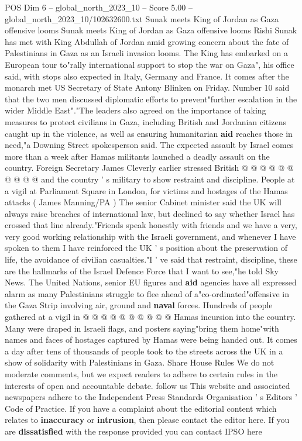 \begin{textsample}{POS Dim 6 – global\_north\_2023\_10 – Score 5.00 – global\_north\_2023\_10/102632600.txt}  \label{ex:f6_pos_244}
Sunak meets King of Jordan as Gaza offensive looms Sunak meets King of Jordan as Gaza offensive looms Rishi Sunak has met with King Abdullah of Jordan amid growing concern about the fate of Palestinians in Gaza as an Israeli invasion looms.
The King has embarked on a European tour to"rally international support to stop the war on Gaza", his office said, with stops also expected in Italy, Germany and France.
It comes after the monarch met US Secretary of State Antony Blinken on Friday.
Number 10 said that the two men discussed diplomatic efforts to prevent"further escalation in the wider Middle East"."The leaders also agreed on the importance of taking measures to protect civilians in Gaza, including British and Jordanian citizens caught up in the violence, as well as ensuring humanitarian \textbf{aid} reaches those in need,"a Downing Street spokesperson said.
The expected assault by Israel comes more than a week after Hamas militants launched a deadly assault on the country.
Foreign Secretary James Cleverly earlier stressed British @ @ @ @ @ @ @ @ @ @ and the country ' s military to show restraint and discipline.
People at a vigil at Parliament Square in London, for victims and hostages of the Hamas attacks ( James Manning/PA ) The senior Cabinet minister said the UK will always raise breaches of international law, but declined to say whether Israel has crossed that line already."Friends speak honestly with friends and we have a very, very good working relationship with the Israeli government, and whenever I have spoken to them I have reinforced the UK ' s position about the preservation of life, the avoidance of civilian casualties."I ' ve said that restraint, discipline, these are the hallmarks of the Israel Defence Force that I want to see,"he told Sky News.
The United Nations, senior EU figures and \textbf{aid} agencies have all expressed alarm as many Palestinians struggle to flee ahead of a"co-ordinated"offensive in the Gaza Strip involving air, ground and \textbf{naval} forces.
Hundreds of people gathered at a vigil in @ @ @ @ @ @ @ @ @ @ Hamas incursion into the country.
Many were draped in Israeli flags, and posters saying"bring them home"with names and faces of hostages captured by Hamas were being handed out.
It comes a day after tens of thousands of people took to the streets across the UK in a show of solidarity with Palestinians in Gaza.
Share House Rules We do not moderate comments, but we expect readers to adhere to certain rules in the interests of open and accountable debate. follow us This website and associated newspapers adhere to the Independent Press Standards Organisation ' s Editors ' Code of Practice.
If you have a complaint about the editorial content which relates to \textbf{inaccuracy} or \textbf{intrusion}, then please contact the editor here.
If you are \textbf{dissatisfied} with the response provided you can contact IPSO here

\end{textsample}

